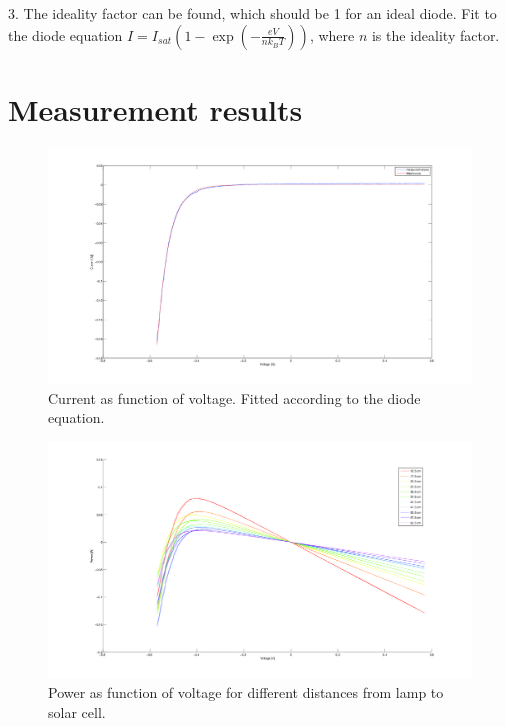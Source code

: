 \documentclass[a4paper]{article}
\begin{document}
3. The ideality factor can be found, which should be 1 for an ideal diode. Fit to the diode equation $I = I_{sat}\left(1-\exp\left(-\frac{eV}{nk_BT}\right)\right)$, where $n$ is the ideality factor.

\section{Measurement results}

\begin{figure}[h!]
  \begin{center}
    \includegraphics[scale=0.3]{IvsUnoIlumination.jpg}
  \end{center}
  \caption{Current as function of voltage. Fitted according to the diode equation.}
  \label{ivsun}
\end{figure}

\begin{figure}[h!]
  \begin{center}
    \includegraphics[scale=0.3]{PvsV.jpg}
  \end{center}
  \caption{Power as function of voltage for different distances from lamp to solar cell.}
  \label{pvsv}
\end{figure}
\end{document}
